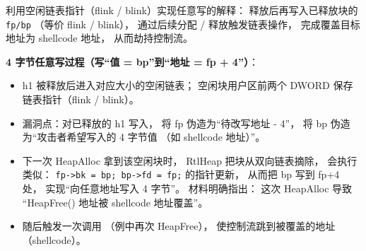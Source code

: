 \documentclass[UTF8]{ctexart}
\begin{document}
利用空闲链表指针（flink / blink）实现任意写的解释：
释放后再写入已释放块的 \texttt{fp/bp}
（等价 flink / blink），
通过后续分配 / 释放触发链表操作，
完成覆盖目标地址为 shellcode 地址，
从而劫持控制流。

\textbf{4 字节任意写过程（写“值 = bp”到“地址 = fp + 4”）}：

\begin{itemize}
  \item [(1)]h1 被释放后进入对应大小的空闲链表；
        空闲块用户区前两个 DWORD 保存链表指针（flink / blink）。
  \item [(2)]漏洞点：对已释放的 h1 写入，
        将 fp 伪造为“待改写地址 - 4”，
        将 bp 伪造为“攻击者希望写入的 4 字节值
        （如 shellcode 地址）”。
  \item [(3)]下一次 HeapAlloc 拿到该空闲块时，
        RtlHeap 把块从双向链表摘除，
        会执行类似：
        \texttt{fp->bk = bp; bp->fd = fp;}
        的指针更新，
        从而把 bp 写到 fp+4 处，
        实现“向任意地址写入 4 字节”。
        材料明确指出：
        这次 HeapAlloc 导致
        “HeapFree() 地址被 shellcode 地址覆盖”。
  \item [(4)]随后触发一次调用
        （例中再次 HeapFree），
        使控制流跳到被覆盖的地址（shellcode）。
\end{itemize}
\end{document}
